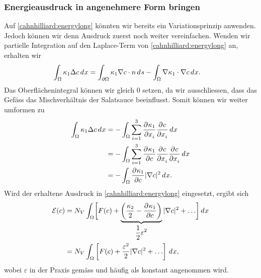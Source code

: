 \subsubsection{Energieausdruck in angenehmere Form bringen}
Auf \eqref{cahnhilliard:energylong} könnten wir bereits ein Variationsprinzip anwenden.
Jedoch können wir denn Ausdruck zuerst noch weiter vereinfachen.
Wenden wir partielle Integration auf den Laplace-Term von \eqref{cahnhilliard:energylong} an,
erhalten wir
\begin{align*}
\int_\Omega \kappa_1 \Delta c \,d^{}{x}
&=
\int_{\partial\Omega} \kappa_1 \nabla c \cdot n \,d^{}{s}
- \int_\Omega \nabla \kappa_1 \cdot \nabla c \,d^{}{x}
.
\end{align*}
Das Oberflächenintegral können wir gleich $0$ setzen,
da wir ausschliessen,
dass das Gefäss das Mischverhältnis der Salatsauce beeinflusst.
Somit können wir weiter umformen zu
\begin{align*}
\int_\Omega \kappa_1 \Delta c \,d^{}{x}
&=-\int_\Omega \sum_{i=1}^3 \frac{\partial^{} \kappa_1}{\partial x_i^{}} \frac{\partial^{} c}{\partial x_i^{}} \,d^{}{x}
\\
&=-\int_\Omega \sum_{i=1}^3 \frac{\partial^{} \kappa_1}{\partial c^{}} \frac{\partial^{} c}{\partial x_i^{}} \frac{\partial^{} c}{\partial x_i^{}} \,d^{}{x}
\\
&=
-\int_\Omega \frac{\partial^{} \kappa_1}{\partial c^{}} |\nabla c|^2 \,d^{}{x}
.
\end{align*}
Wird der erhaltene Ausdruck in \eqref{cahnhilliard:energylong} eingesetzt,
ergibt sich
\begin{align}
\mathcal{E}(c)
&=
N_V \int_\Omega \biggl[
  F(c) + \underbrace{\left( \frac{\kappa_2}{2} - \frac{\partial^{} \kappa_1}{\partial c^{}} \right)}_{\displaystyle\frac{1}{2}\varepsilon^2} |\nabla c|^2  + \ldots
\biggr]\,d^{}{x}
\nonumber
\\
&=
N_V \int_\Omega \left[
  F(c) + \frac{\varepsilon^2}{2} |\nabla c|^2  + \ldots
\right]\,d^{}{x}
,
\label{cahnhilliard:energy}
\end{align}
wobei $\varepsilon$ in der Praxis gemäss \cite{cahnhilliard:freeenergy}
und \cite{cahnhilliard:deriv} häufig als konstant angenommen wird.
